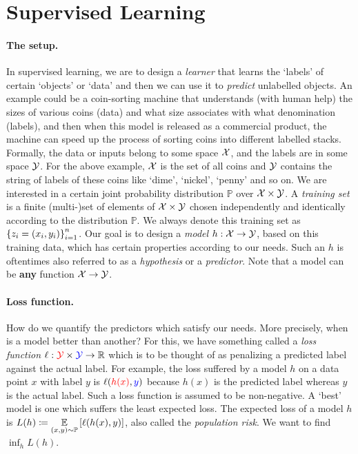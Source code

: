 \section{Supervised Learning}
\paragraph{The setup.} In supervised learning, we are to design a \textit{learner} that learns the `labels' of certain `objects' or `data' and then we can use it to \textit{predict} unlabelled objects. An example could be a coin-sorting machine that understands (with human help) the sizes of various coins (data) and what size associates with what denomination (labels), and then when this model is released as a commercial product, the machine can speed up the process of sorting coins into different labelled stacks. 
\\
Formally, the data or inputs belong to some space ${\mathcal{X}}$, and the labels are in some space ${\mathcal{Y}}$. For the above example, ${\mathcal{X}}$ is the set of all coins and ${\mathcal{Y}}$ contains the string of labels of these coins like `dime', `nickel', `penny' and so on. We are interested in a certain joint probability distribution $\mathbb P$ over ${\mathcal{X}}\times {\mathcal{Y}}$. A \textit{training set} is a finite (multi-)set of elements of ${\mathcal{X}}\times {\mathcal{Y}}$ chosen independently and identically according to the distribution $\mathbb P$. We always denote this training set as $\left\{z_{i}=(x_{i},y_{i})\right\}_{i=1}^{n}$. Our goal is to design a \textit{model} $h:{\mathcal{X}}\to{\mathcal{Y}}$, based on this training data, which has certain properties according to our needs. Such an $h$ is oftentimes also referred to as a \textit{hypothesis} or a \textit{predictor}. Note that a model can be \textbf{any} function ${\mathcal{X}}\to{\mathcal{Y}}$.

\paragraph{Loss function.} How do we quantify the predictors which satisfy our needs. More precisely, when is a model better than another? For this, we have something called a \textit{loss function} $\ell:{\color{red}{\mathcal{Y}}}\times {\color{blue}{\mathcal{Y}}} \to \mathbb{R}$ which is to be thought of as penalizing a {\color{red}predicted label} against the {\color{blue}actual label}. For example, the loss suffered by a model $h$ on a data point $x$ with label $y$ is $\ell({\color{red}h(x)},{\color{blue}y})$ because $h(x)$ is the predicted label whereas $y$ is the actual label. Such a loss function is assumed to be non-negative. A `best' model is one which suffers the least expected loss. The expected loss of a model $h$ is $\displaystyle L(h) \coloneqq \underset{(x,y)\sim\mathbb P}{\mathbb E} \left[\ell(h(x),y)\right]$, also called the \textit{population risk}. We want to find $\inf_{h} L(h)$.

